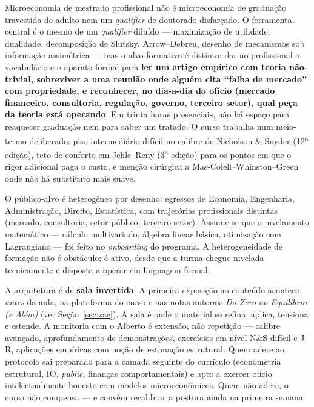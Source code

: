 \documentclass[11pt,a4paper]{article}
\newcommand{\zae}{\textit{Do Zero ao Equilíbrio (e Além)}}
\begin{document}
Microeconomia de mestrado profissional não é microeconomia de graduação travestida de adulto nem um \textit{qualifier} de doutorado disfarçado. O ferramental central é o mesmo de um \textit{qualifier} diluído --- maximização de utilidade, dualidade, decomposição de Slutsky, Arrow--Debreu, desenho de mecanismos sob informação assimétrica --- mas o alvo formativo é distinto: dar ao profissional o vocabulário e o aparato formal para \textbf{ler um artigo empírico com teoria não-trivial, sobreviver a uma reunião onde alguém cita ``falha de mercado'' com propriedade, e reconhecer, no dia-a-dia do ofício (mercado financeiro, consultoria, regulação, governo, terceiro setor), qual peça da teoria está operando}. Em trinta horas presenciais, não há espaço para reaquecer graduação nem para caber um tratado. O curso trabalha num meio-termo deliberado: piso intermediário-difícil no calibre de Nicholson \& Snyder (12\textsuperscript{a} edição), teto de conforto em Jehle--Reny (3\textsuperscript{a} edição) para os pontos em que o rigor adicional paga o custo, e menção cirúrgica a Mas-Colell--Whinston--Green onde não há substituto mais suave.

O público-alvo é heterogêneo por desenho: egressos de Economia, Engenharia, Administração, Direito, Estatística, com trajetórias profissionais distintas (mercado, consultoria, setor público, terceiro setor). Assume-se que o nivelamento matemático --- cálculo multivariado, álgebra linear básica, otimização com Lagrangiano --- foi feito no \textit{onboarding} do programa. A heterogeneidade de formação não é obstáculo; é ativo, desde que a turma chegue nivelada tecnicamente e disposta a operar em linguagem formal.

A arquitetura é de \textbf{sala invertida}. A primeira exposição ao conteúdo acontece \emph{antes} da aula, na plataforma do curso e nas notas autorais \zae{} (ver Seção~\ref{sec:zae}). A sala é onde o material se refina, aplica, tensiona e estende. A monitoria com o Alberto é extensão, não repetição --- calibre avançado, aprofundamento de demonstrações, exercícios em nível N\&S-difícil e J-R, aplicações empíricas com noção de estimação estrutural. Quem adere ao protocolo sai preparado para a camada seguinte do currículo (econometria estrutural, IO, \textit{public}, finanças comportamentais) e apto a exercer ofício intelectualmente honesto com modelos microeconômicos. Quem não adere, o curso não compensa --- e convém recalibrar a postura ainda na primeira semana.

\end{document}
